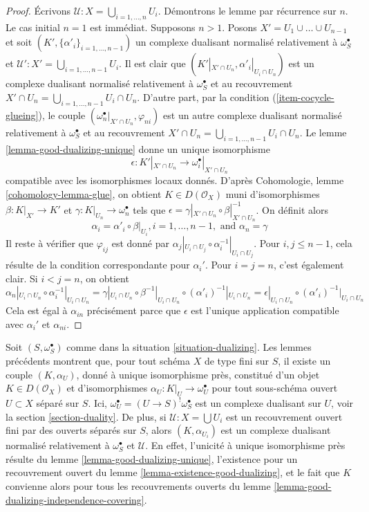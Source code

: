 \begin{proof}
Écrivons $\mathcal{U} : X = \bigcup_{i = 1, \ldots, n} U_i$. Démontrons le lemme par récurrence sur $n$. Le cas initial $n = 1$ est immédiat. Supposons $n > 1$. Posons $X' = U_1 \cup \ldots \cup U_{n - 1}$ et soit $(K', \{\alpha'_i\}_{i = 1, \ldots, n - 1})$ un complexe dualisant normalisé relativement à $\omega_S^\bullet$ et $\mathcal{U}' : X' = \bigcup_{i = 1, \ldots, n - 1} U_i$. Il est clair que $(K'|_{X' \cap U_n}, \alpha'_i|_{U_i \cap U_n})$ est un complexe dualisant normalisé relativement à $\omega_S^\bullet$ et au recouvrement $X' \cap U_n = \bigcup_{i = 1, \ldots, n - 1} U_i \cap U_n$. D'autre part, par la condition (\ref{item-cocycle-glueing}), le couple
$(\omega_n^\bullet|_{X' \cap U_n}, \varphi_{ni})$
est un autre complexe dualisant normalisé relativement à $\omega_S^\bullet$ et au recouvrement $X' \cap U_n = \bigcup_{i = 1, \ldots, n - 1} U_i \cap U_n$. Le lemme \ref{lemma-good-dualizing-unique} donne un unique isomorphisme
$$
\epsilon : K'|_{X' \cap U_n} \longrightarrow \omega_i^\bullet|_{X' \cap U_n}
$$
compatible avec les isomorphismes locaux donnés. D'après Cohomologie, lemme \ref{cohomology-lemma-glue}, on obtient $K \in D(\mathcal{O}_X)$ muni d'isomorphismes $\beta : K|_{X'} \to K'$ et $\gamma : K|_{U_n} \to \omega_n^\bullet$ tels que $\epsilon = \gamma|_{X'\cap U_n} \circ \beta|_{X' \cap U_n}^{-1}$. On définit alors
$$
\alpha_i = \alpha'_i \circ \beta|_{U_i}, i = 1, \ldots, n - 1,
\text{ and }
\alpha_n = \gamma
$$
Il reste à vérifier que $\varphi_{ij}$ est donné par $\alpha_j|_{U_i \cap U_j} \circ \alpha_i^{-1}|_{U_i \cap U_j}$. Pour $i, j \leq n - 1$, cela résulte de la condition correspondante pour $\alpha_i'$. Pour $i = j = n$, c'est également clair. Si $i < j = n$, on obtient
$$
\alpha_n|_{U_i \cap U_n} \circ \alpha_i^{-1}|_{U_i \cap U_n} =
\gamma|_{U_i \cap U_n} \circ \beta^{-1}|_{U_i \cap U_n}
\circ (\alpha'_i)^{-1}|_{U_i \cap U_n} =
\epsilon|_{U_i \cap U_n} \circ (\alpha'_i)^{-1}|_{U_i \cap U_n}
$$
Cela est égal à $\alpha_{in}$ précisément parce que $\epsilon$ est l'unique application compatible avec $\alpha_i'$ et $\alpha_{ni}$.
\end{proof}

\noindent
Soit $(S, \omega_S^\bullet)$ comme dans la situation \ref{situation-dualizing}. Les lemmes précédents montrent que, pour tout schéma $X$ de type fini sur $S$, il existe un couple $(K, \alpha_U)$, donné à unique isomorphisme près, constitué d'un objet $K \in D(\mathcal{O}_X)$ et d'isomorphismes $\alpha_U : K|_U \to \omega_U^\bullet$ pour tout sous-schéma ouvert $U \subset X$ séparé sur $S$. Ici, $\omega_U^\bullet = (U \to S)^!\omega_S^\bullet$ est un complexe dualisant sur $U$, voir la section \ref{section-duality}. De plus, si $\mathcal{U} : X = \bigcup U_i$ est un recouvrement ouvert fini par des ouverts séparés sur $S$, alors $(K, \alpha_{U_i})$ est un complexe dualisant normalisé relativement à $\omega_S^\bullet$ et $\mathcal{U}$. En effet, l'unicité à unique isomorphisme près résulte du lemme \ref{lemma-good-dualizing-unique}, l'existence pour un recouvrement ouvert du lemme \ref{lemma-existence-good-dualizing}, et le fait que $K$ convienne alors pour tous les recouvrements ouverts du lemme \ref{lemma-good-dualizing-independence-covering}.

